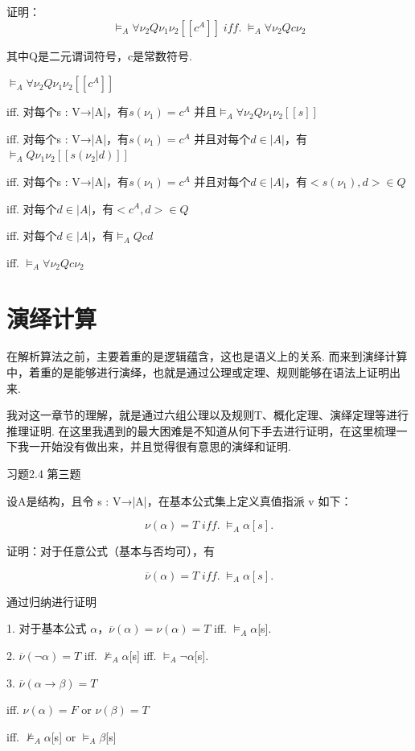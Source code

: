证明：$$\models_{A} \forall \nu_2 Q \nu_1 \nu_2[\![c^A]\!] \; iff. \; \models_{A} \forall \nu_2 Q c \nu_2$$

其中Q是二元谓词符号，c是常数符号.

$\models_{A} \forall \nu_2 Q \nu_1 \nu_2[\![c^A]\!]$

iff. 对每个s : V→|A|，有$ s(\nu_1) = c^A $ 并且$\models_{A} \forall \nu_2 Q \nu_1 \nu_2[\![s]\!]$

iff. 对每个s : V→|A|，有$ s(\nu_1) = c^A $ 并且对每个$d \in |A|$，有$\models_{A} Q \nu_1 \nu_2[\![s(\nu_2|d)]\!]$

iff. 对每个s : V→|A|，有$ s(\nu_1) = c^A $ 并且对每个$d \in |A|$，有$<s(\nu_1), d> \in Q$

iff. 对每个$d \in |A|$，有$<c^A, d> \in Q$

iff. 对每个$d \in |A|$，有$ \models_{A}Qcd$

iff. $\models_{A} \forall \nu_2 Q c \nu_2$

\section{演绎计算}
在解析算法之前，主要着重的是逻辑蕴含，这也是语义上的关系. 而来到演绎计算中，着重的是能够进行演绎，也就是通过公理或定理、规则能够在语法上证明出来.

我对这一章节的理解，就是通过六组公理以及规则T、概化定理、演绎定理等进行推理证明. 在这里我遇到的最大困难是不知道从何下手去进行证明，在这里梳理一下我一开始没有做出来，并且觉得很有意思的演绎和证明.

习题2.4 第三题

设A是结构，且令 s : V→|A|，在基本公式集上定义真值指派 v 如下：

$$ \nu (\alpha)=T   \; iff.  \; \models_{A}\alpha[s].$$

证明：对于任意公式（基本与否均可），有

$$ \overline{\nu} (\alpha)=T     \;   iff. \;  \models_{A}\alpha[s].$$

通过归纳进行证明

1. 对于基本公式 $\alpha$，$ \overline{\nu} (\alpha)=\nu (\alpha)=T$ iff.  $\models_{A} \alpha $[s].

2. $ \overline{\nu} (\neg\alpha)=T$ iff. $\nvDash_{A} \alpha $[s] iff. $\models_{A} \neg\alpha $[s].

3. $ \overline{\nu} (\alpha \rightarrow \beta)=T$

iff. $ \nu (\alpha)=F$ or $ \nu (\beta)=T$

iff. $\nvDash_{A} \alpha $[s] or $\models_{A} \beta $[s]

